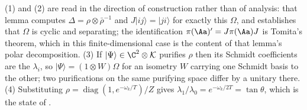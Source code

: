 (1) and (2) are \cite[Lem.~7.1]{ButlerT5} read in the direction of construction rather than of analysis: that lemma computes $\Delta = \rho\otimes\bar\rho^{-1}$ and $J|ij\rangle = |ji\rangle$ for exactly this $\Omega$, and establishes that $\Omega$ is cyclic and separating; the identification $\pi(\Aa)' = J\pi(\Aa)J$ is Tomita's theorem, which in this finite-dimensional case is the content of that lemma's polar decomposition. (3) If $|\Psi\rangle \in \C^2\otimes\mathcal{K}$ purifies $\rho$ then its Schmidt coefficients are the $\lambda_i$, so $|\Psi\rangle = (1\otimes W)\Omega$ for an isometry $W$ carrying one Schmidt basis to the other; two purifications on the same purifying space differ by a unitary there. (4) Substituting $\rho = \operatorname{diag}(1, e^{-\omega_k/T})/Z$ gives $\lambda_1/\lambda_0 = e^{-\omega_k/2T} = \tan\theta$, which is the state of \cite[Lem.~7.2]{ButlerT5}.
